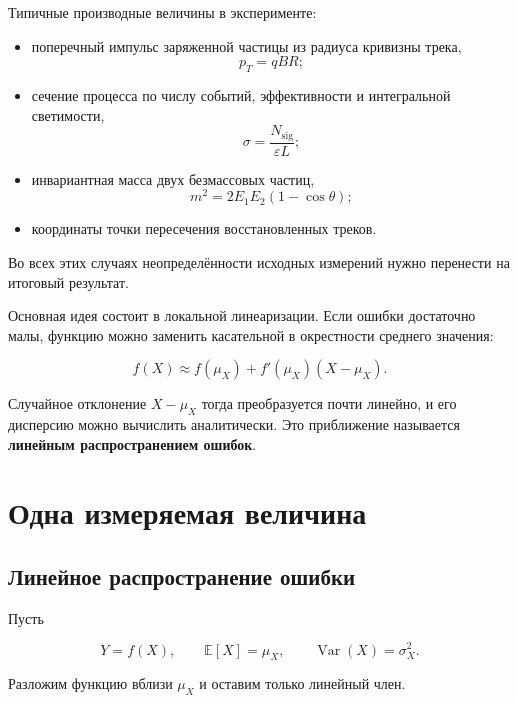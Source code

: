 \documentclass[
  russian,
  12pt,
  a4paper,
  a4paper,
  openany]{scrbook}
\providecommand{\tightlist}{%
  \setlength{\itemsep}{0pt}\setlength{\parskip}{0pt}}
\begin{document}
\begin{booknote}

Типичные производные величины в эксперименте:

\begin{itemize}
\tightlist
\item
  поперечный импульс заряженной частицы из радиуса кривизны трека,
  \[p_T=qBR;\]
\item
  сечение процесса по числу событий, эффективности и интегральной
  светимости, \[\sigma=\frac{N_{\mathrm{sig}}}{\varepsilon L};\]
\item
  инвариантная масса двух безмассовых частиц,
  \[m^2=2E_1E_2(1-\cos\theta);\]
\item
  координаты точки пересечения восстановленных треков.
\end{itemize}

Во всех этих случаях неопределённости исходных измерений нужно перенести
на итоговый результат.

\end{booknote}

Основная идея состоит в локальной линеаризации. Если ошибки достаточно
малы, функцию можно заменить касательной в окрестности среднего
значения:

\[
\boxed{
f(X)\approx f(\mu_X)+f'(\mu_X)(X-\mu_X).
}
\]

Случайное отклонение \(X-\mu_X\) тогда преобразуется почти линейно, и
его дисперсию можно вычислить аналитически. Это приближение называется
\textbf{линейным распространением ошибок}.

\section{Одна измеряемая
величина}\label{ux43eux434ux43dux430-ux438ux437ux43cux435ux440ux44fux435ux43cux430ux44f-ux432ux435ux43bux438ux447ux438ux43dux430}

\subsection{Линейное распространение
ошибки}\label{ux43bux438ux43dux435ux439ux43dux43eux435-ux440ux430ux441ux43fux440ux43eux441ux442ux440ux430ux43dux435ux43dux438ux435-ux43eux448ux438ux431ux43aux438}

Пусть

\[
Y=f(X),
\qquad
\mathbb E[X]=\mu_X,
\qquad
\operatorname{Var}(X)=\sigma_X^2.
\]

Разложим функцию вблизи \(\mu_X\) и оставим только линейный член.
\end{document}
